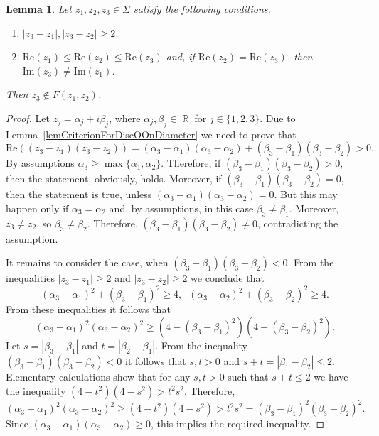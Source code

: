 \documentclass{amsart}
\numberwithin{equation}{section}
\newtheorem{lemma}[theorem]{Lemma}
\theoremstyle{definition}
\theoremstyle{remark}
\DeclareMathOperator{\RR}{\mathbb R}
\begin{document}
	\begin{lemma}\label{lemInSameStrip}
		Let $z_1, z_2, z_3 \in \Sigma$ satisfy the following conditions.
		\begin{enumerate}[label=(\roman*)]
			\item $|z_3 - z_1|, |z_3 - z_2| \ge 2$.
			\item $\mathrm{Re}(z_1) \le \mathrm{Re}(z_2) \le \mathrm{Re}(z_3)$ and, if $\mathrm{Re}(z_2) = \mathrm{Re}(z_3)$, then $\mathrm{Im}(z_3) \ne \mathrm{Im}(z_1)$.
		\end{enumerate}
		Then $z_3 \notin F(z_1, z_2)$.
	\end{lemma}
	\begin{proof}
		
		Let $z_j = \alpha_j + i\beta_j$, where $\alpha_j, \beta_j \in \RR$ for $j \in \{1,2,3\}$. Due to Lemma~\ref{lemCriterionForDiscOOnDiameter} we need to prove that 
		\[
		\mathrm{Re}\left((z_3 - z_1)(\overline{z_3} - \overline{z_2})\right)  = (\alpha_3 - \alpha_1)(\alpha_3 - \alpha_2) + (\beta_3 - \beta_1)(\beta_3 - \beta_2) > 0.
		\]
		By assumptions $\alpha_3 \ge \max\{\alpha_1, \alpha_2\}$. Therefore, if $(\beta_3 - \beta_1)(\beta_3 - \beta_2) > 0$, then the statement, obviously, holds. Moreover, if $(\beta_3 - \beta_1)(\beta_3 - \beta_2) = 0$, then the statement is true, unless $(\alpha_3 - \alpha_1)(\alpha_3 - \alpha_2) = 0$. But this may happen only if $\alpha_3 = \alpha_2$ and, by assumptions, in this case $\beta_3 \ne \beta_1$. Moreover, $z_3 \ne z_2$, so $\beta_3 \ne \beta_2$. Therefore, $(\beta_3 - \beta_1)(\beta_3 - \beta_2) \ne 0$, contradicting the assumption. 
		
		It remains to consider the case, when $(\beta_3 - \beta_1)(\beta_3 - \beta_2) < 0$. From the inequalities $|z_3 - z_1| \ge 2$ and $|z_3 - z_2| \ge 2$ we conclude that
		\[
		(\alpha_3 - \alpha_1)^2 + (\beta_3 - \beta_1)^2 \ge 4,\;\;(\alpha_3 - \alpha_2)^2 + (\beta_3 - \beta_2)^2 \ge 4.
		\]
		From these inequalities it follows that
		\begin{equation*}
			(\alpha_3 - \alpha_1)^2(\alpha_3 - \alpha_2)^2 \ge (4 - (\beta_3 - \beta_1)^2)(4 - (\beta_3 - \beta_2)^2).
		\end{equation*}
		Let $s = |\beta_3 - \beta_1|$ and $t = |\beta_2 - \beta_1|$. From the inequality $(\beta_3 - \beta_1)(\beta_3 - \beta_2) < 0$ it follows that $s, t > 0$ and $s + t = |\beta_1 - \beta_2| \le 2$. Elementary calculations show that for any $s,t > 0$ such that $s + t \le 2$ we have the inequality $(4 - t^2)(4 - s^2) > t^2s^2$. Therefore,
		\[
		(\alpha_3 - \alpha_1)^2(\alpha_3 - \alpha_2)^2 \ge (4 - t^2)(4 - s^2) > t^2s^2 = (\beta_3 - \beta_1)^2(\beta_3 - \beta_2)^2.
		\]
		Since $(\alpha_3 - \alpha_1)(\alpha_3 - \alpha_2) \ge 0$, this implies the required inequality.
	\end{proof}
	
\end{document}
